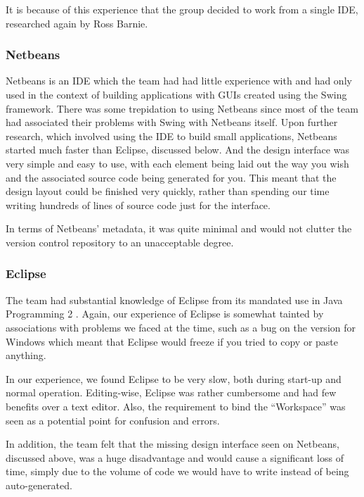 It is because of this experience that the group decided to work from a
single IDE, researched again by Ross Barnie.

\subsubsection{Netbeans}
\label{impl:ui:ide:netbeans}

Netbeans is an IDE which the team had had little experience with and had
only used in the context of building applications with GUIs created
using the Swing framework.
There was some trepidation to using Netbeans since most of the team
had associated their problems with Swing with Netbeans itself.
Upon further research, which involved using the IDE to build small
applications, Netbeans started much faster than Eclipse, discussed
below.
And the design interface was very simple and easy to use, with each
element being laid out the way you wish and the associated source code
being generated for you.
This meant that the design layout could be finished very quickly,
rather than spending our time writing hundreds of lines of source code
just for the interface.

In terms of Netbeans' metadata, it was quite minimal and would not
clutter the version control repository to an unacceptable degree.

\subsubsection{Eclipse}
\label{impl:ui:ide:eclipse}

The team had substantial knowledge of Eclipse from its mandated use in
Java Programming 2 \cite{javaProgramming2}. Again, our experience of 
Eclipse is somewhat tainted by associations with problems we faced at 
the time, such as a bug on the version for Windows which meant that 
Eclipse would freeze if you tried to copy or paste anything.

In our experience, we found Eclipse to be very slow, both during 
start-up and normal operation. 
Editing-wise, Eclipse was rather cumbersome and had few benefits over
a text editor.
Also, the requirement to bind the ``Workspace'' was seen as a potential
point for confusion and errors.

In addition, the team felt that the missing design interface seen on
Netbeans, discussed above, was a huge disadvantage and would cause a
significant loss of time, simply due to the volume of code we would
have to write instead of being auto-generated.

